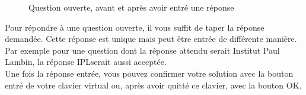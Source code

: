 \documentclass[11pt]{scrreprt}
\begin{document}
\begin{figure}[H]
{        }
        \caption{Question ouverte, avant et après avoir entré une réponse}
    \end{figure}
    Pour répondre à une question ouverte, il vous suffit de taper la réponse demandée. Cette réponse est unique mais peut être entrée de différente manière. Par exemple pour une question dont la réponse attendu serait \og Institut Paul Lambin\fg, la réponse \og IPL\fg serait aussi acceptée.\\

    Une fois la réponse entrée, vous pouvez confirmer votre solution avec la bouton entré de votre clavier virtual ou, après avoir quitté ce clavier, avec la bouton OK.
\end{document}
